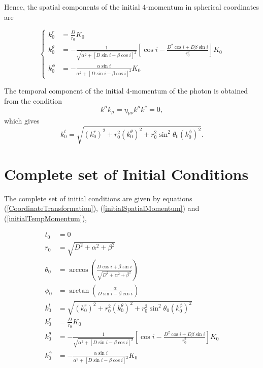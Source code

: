 Hence, the spatial components of the initial 4-momentum in spherical coordinates are

\begin{equation}
\begin{cases}
k^r_0 &= \frac{D}{r_0} K_0\\
k^\theta _0 &= -\frac{1}{\sqrt{\alpha^2 +[D\sin i - \beta \cos i]^2}}  \left[ \cos i - \frac{D^2 \cos i + D\beta \sin i}{r^2_0}\right] K_0 \\
k^\phi _0 &= -\frac{\alpha \sin i}{\alpha^2 +[D \sin i - \beta \cos i]^2 } K_0
\end{cases} \label{initialSpatialMomentum}
\end{equation}

The temporal component of the initial 4-momentum of the photon is obtained from the condition 
\begin{equation}
k^\mu k_\mu =  \eta_{\mu \nu} k^\mu k^\nu = 0,
\end{equation}
which gives
\begin{equation}
k^t_0 = \sqrt{(k^r_0)^2 + r_0^2 (k^\theta _0)^2 + r_0^2 \sin^2 \theta_0 (k^\phi _0)^2}. \label{initialTempMomentum}
\end{equation}

\section{Complete set of Initial Conditions}

The complete set of initial conditions are given by equations (\ref{CoordinateTransformation}), (\ref{initialSpatialMomentum}) and (\ref{initialTempMomentum}),

\begin{align}
t_0 &= 0\\
r_0 &= \sqrt{D^2 + \alpha^2 + \beta^2} \\
\theta_0 &= \arccos \left( \frac{D \cos i + \beta \sin i}{\sqrt{D^2 + \alpha^2 + \beta^2}}\right)\\
\phi_0 &= \arctan \left( \frac{\alpha}{D\sin i - \beta \cos i} \right) \\
k^t_0 &= \sqrt{(k^r_0)^2 + r_0^2 (k^\theta _0)^2 + r_0^2 \sin^2 \theta_0 (k^\phi _0)^2}\\
k^r_0 &= \frac{D}{r_0} K_0\\
k^\theta _0 &= -\frac{1}{\sqrt{\alpha^2 +[D\sin i - \beta \cos i]^2}}  \left[ \cos i - \frac{D^2 \cos i + D\beta \sin i}{r^2_0}\right] K_0 \\
k^\phi _0 &= -\frac{\alpha \sin i}{\alpha^2 +[D \sin i - \beta \cos i]^2 } K_0
\end{align}

